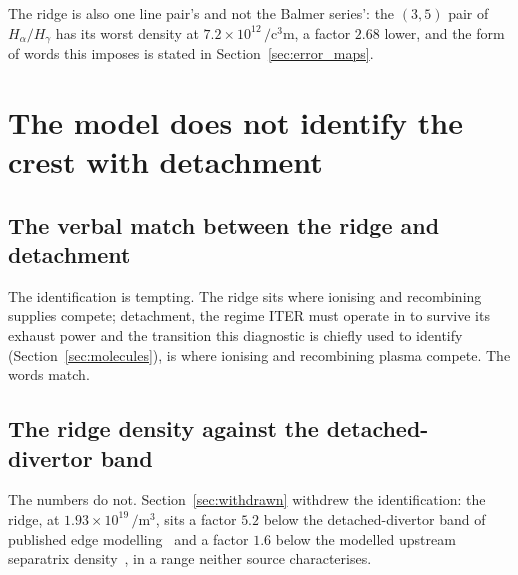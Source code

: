 The ridge is also one line pair's and not the Balmer series': the $(3,5)$ pair
of $H_\alpha/H_\gamma$ has its worst density at
$7.2\times10^{12}\,\si{\per\cubic\centi\metre}$, a factor $2.68$ lower, and the
form of words this imposes is stated in Section~\ref{sec:error_maps}.

\section{The model does not identify the crest with detachment}
\label{sec:not_detachment}

\subsection{The verbal match between the ridge and detachment}

The identification is tempting. The ridge sits where ionising and recombining
supplies compete; detachment, the regime ITER must operate in to survive its
exhaust power and the transition this diagnostic is chiefly used to identify
(Section~\ref{sec:molecules}), is where ionising and recombining plasma compete.
The words match.

\subsection{The ridge density against the detached-divertor band}

The numbers do not. Section~\ref{sec:withdrawn} withdrew the identification:
the ridge, at $1.93\times10^{19}\,\si{\per\cubic\metre}$, sits a factor $5.2$
below the detached-divertor band of published edge
modelling~\cite{Guillemaut2011} and a factor $1.6$ below the modelled upstream
separatrix density~\cite{Stangeby2023,Pitts2019}, in a range neither source
characterises.

